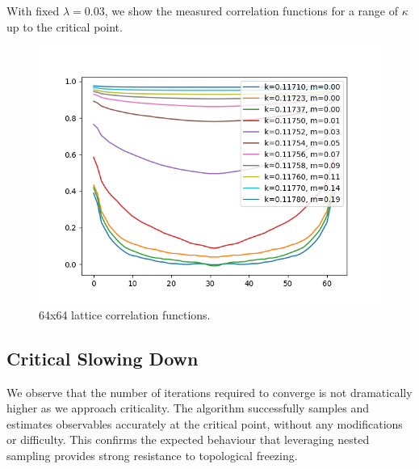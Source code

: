 \documentclass[11pt]{article}
\begin{document}
    With fixed $\lambda=0.03$, we show the measured correlation functions for a range
    of $\kappa$ up to the critical point.

\begin{figure}[h!]
    \center
    \includegraphics[width=\linewidth]{../figures/correlations_n64}
    \caption{
        64x64 lattice correlation functions.
    }\label{fig:correlation_functions}
\end{figure}


\subsection{Critical Slowing Down}\label{subsec:critical_slowing_down}
We observe that the number of iterations required to converge is not dramatically higher as we approach criticality.
The algorithm successfully samples and estimates observables accurately at the critical point, without any
modifications or difficulty.
This confirms the expected behaviour that leveraging nested sampling provides strong resistance to topological freezing.
\end{document}
